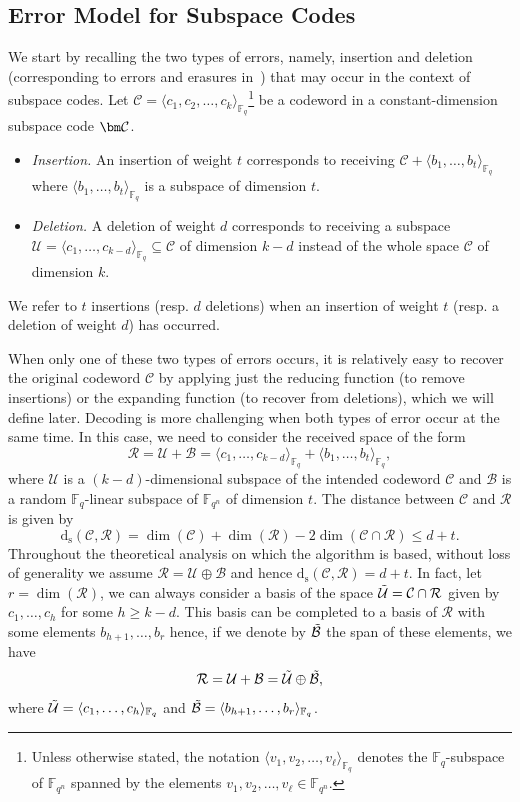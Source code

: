 \documentclass{article}
\newcommand{\Fq}{\mathbb{F}_{q}}
\newcommand{\Fqn}{\mathbb{F}_{q^n}}
\newcommand{\ds}{\mathrm{d_s}}
\newcommand{\calB}{\mathcal{B}}
\newcommand{\calC}{\mathcal{C}}
\newcommand{\calR}{\mathcal{R}}
\newcommand{\calU}{\mathcal{U}}
\newcommand{\Span}[2]{\langle #2 \rangle_{#1}}
\begin{document}
\subsection{Error Model for Subspace Codes}
\label{subsec: error model}
We start by recalling the two types of errors, namely, insertion and deletion (corresponding to errors and erasures in~\cite[Sec.~III-C]{Kotter08}) that may occur in the context of subspace codes. Let $\calC = \Span{\Fq}{c_1,c_2,\dots,c_k}$\footnote{Unless otherwise stated, the notation $\Span{\Fq}{v_1,v_2,\dots,v_{\ell}}$ denotes the $\Fq$-subspace of $\Fqn$ spanned by the elements $v_1,v_2,\dots,v_{\ell}\in\Fqn$.} be a codeword in a constant-dimension subspace code $\bm \calC$.
\begin{itemize}
	\item \textit{Insertion.} 
	An insertion of weight $t$ corresponds to receiving $\calC + \Span{\Fq}{b_1, \ldots, b_t}$ where $\Span{\Fq}{b_1, \ldots, b_t}$ is a subspace of dimension $t.$
	\item \textit{Deletion.} A deletion of weight $d$ corresponds to receiving a subspace $\calU = \Span{\Fq}{c_1,\ldots,c_{k-d}} \subseteq \calC$ of dimension $k-d$ instead of the whole space $\calC$ of dimension $k.$  
	
\end{itemize}
We refer to $t$ insertions (resp. $d$ deletions) when an insertion of weight $t$ (resp. a deletion of weight $d$) has occurred.

\par When only one of these two types of errors occurs, it is relatively easy to recover the original codeword $\calC$ by applying just the reducing function (to remove insertions) or the expanding function (to recover from deletions), which we will define later.
Decoding is more challenging when both types of error occur at the same time.
In this case, we need to consider the received space of the form
$$
\calR = \calU + \calB = \Span{\Fq}{c_1, \ldots, c_{k-d}} + \Span{\Fq}{b_1, \ldots, b_{t}},
$$
where $\calU$ is a $(k-d)$-dimensional subspace of the intended codeword $\calC$ and $\calB$ is a random $\Fq$-linear subspace of $\Fqn$ of dimension $t.$ The distance between $\calC$ and $\calR$ is given by 
$$\ds(\calC, \calR)=\dim(\calC) + \dim(\calR) - 2 \dim(\calC \cap \calR)\leq d+t.$$
Throughout the theoretical analysis on which the algorithm is based, without loss of generality we assume $\calR = \calU \oplus \calB$ and hence $\ds(\calC, \calR)=d+t$. 
In fact, let $r= \dim(\calR)$, we can always consider a basis of the space $
\Tilde{\calU} = \calC \cap \calR$ given by $c_1, \ldots , c_h$ for some $h \geq k-d$.
This basis can be completed to a basis of $\calR$ with some elements $b_{h+1}, \ldots , b_{r}$ hence, if we denote by $\Tilde{\calB}$ the span of these elements, we have 
\[
\calR = \calU + \calB = \Tilde{\calU}\oplus\Tilde{\calB},
\]
where $\Tilde{\calU}=\Span{\Fq}{c_1, \ldots, c_{h}}$ and $\Tilde{\calB}=\Span{\Fq}{b_{h+1}, \ldots, b_{r}}$.
\end{document}

